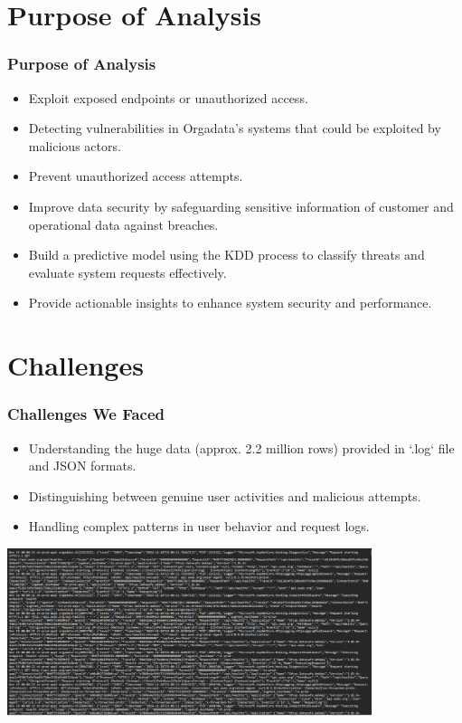 \documentclass[10pt, a4paper]{beamer}
\begin{document}
	\section{Purpose of Analysis}
	\begin{frame}
		\frametitle{Purpose of Analysis}
		
		\begin{block}{}
			\begin{itemize}
				\item Exploit exposed endpoints or unauthorized access.
				\item Detecting vulnerabilities in Orgadata's systems that could be exploited by malicious actors.
				\item Prevent unauthorized access attempts.
				\item Improve data security by safeguarding sensitive information of customer and operational data against breaches.
				\item Build a predictive model using the KDD process to classify threats and evaluate system requests effectively.
				\item Provide actionable insights to enhance system security and performance.
			\end{itemize}
		\end{block}
		
	\end{frame}
	
	
\section{Challenges}
\begin{frame}
	\frametitle{Challenges We Faced}
	
	\begin{block}{}
		\begin{itemize}
			\item Understanding the huge data (approx. 2.2 million rows) provided in `.log` file and JSON formats.
			\item Distinguishing between genuine user activities and malicious attempts.
			\item Handling complex patterns in user behavior and request logs.
		\end{itemize}
	\end{block}
	
	\centering
	\includegraphics[width=0.8\textwidth]{images/LogSS.png} %
	\centering
	\captionof{figure}{1.Raw Log Data}
	
\end{frame}
\end{document}
